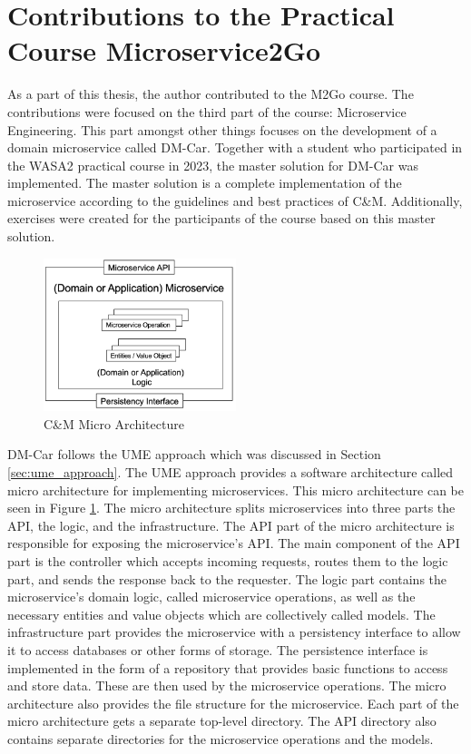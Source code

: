\section{Contributions to the Practical Course Microservice2Go}
\label{sec:m2g_contribution}

As a part of this thesis, the author contributed to the M2Go course. The
contributions were focused on the third part of the course: Microservice
Engineering. This part amongst other things focuses on the development of a
domain microservice called DM-Car. Together with a student \cite{La23} who
participated in the WASA2 practical course in 2023, the master solution for
DM-Car was implemented. The master solution is a complete implementation of the
microservice according to the guidelines and best practices of C\&M.
Additionally, exercises were created for the participants of the course based
on this master solution.

\begin{figure}[tb]
	\centering
	\includegraphics[width=0.5\textwidth]{figures/8.5_micro_architecture.png}
	\caption{C\&M Micro Architecture \cite{CM-W-IMP}}
	\label{fig:micro_architecture}
\end{figure}

DM-Car follows the UME approach which was discussed in Section
\ref{sec:ume_approach}. The UME approach provides a software architecture
called micro architecture for implementing microservices. This micro
architecture can be seen in Figure \ref{fig:micro_architecture}. The micro
architecture splits microservices into three parts the API, the logic, and the
infrastructure. The API part of the micro architecture is responsible for
exposing the microservice's API. The main component of the API part is the
controller which accepts incoming requests, routes them to the logic part, and
sends the response back to the requester. The logic part contains the
microservice's domain logic, called microservice operations, as well as the
necessary entities and value objects which are collectively called models. The
infrastructure part provides the microservice with a persistency interface to
allow it to access databases or other forms of storage. The persistence
interface is implemented in the form of a repository that provides basic
functions to access and store data. These are then used by the microservice
operations. The micro architecture also provides the file structure for the
microservice. Each part of the micro architecture gets a separate top-level
directory. The API directory also contains separate directories for the
microservice operations and the models.

